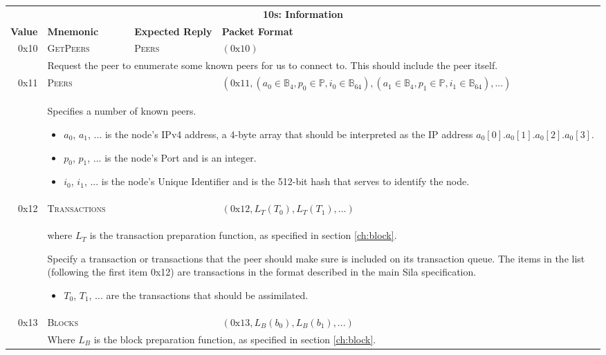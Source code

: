 \begin{tabular*}{\columnwidth}[h]{rlll}
\toprule
\multicolumn{4}{c}{\textbf{10s: Information}} \vspace{5pt} \\
\textbf{Value} & \textbf{Mnemonic} & \textbf{Expected Reply} & \textbf{Packet Format} \vspace{5pt} \\
0x10 & \textsc{GetPeers} & \textsc{Peers} & $(\text{0x}10)$ \\
& \multicolumn{3}{p{0.8\columnwidth}}{Request the peer to enumerate some known peers for us to connect to. This should include the peer itself.}\\
\midrule
0x11 & \textsc{Peers} & & $(\text{0x}11, (a_0 \in \mathbb{B}_4, p_0 \in \mathbb{P}, i_0 \in \mathbb{B}_{64}), (a_1 \in \mathbb{B}_4, p_1 \in \mathbb{P}, i_1 \in \mathbb{B}_{64}), ...)$ \\
& \multicolumn{3}{p{0.8\columnwidth}}{
Specifies a number of known peers. 
\begin{itemize}
\item $a_0$, $a_1$, ... is the node's IPv4 address, a 4-byte array that should be interpreted as the IP address $a_0[0]$.$a_0[1]$.$a_0[2]$.$a_0[3]$.
\item $p_0$, $p_1$, ... is the node's Port and is an integer.
\item $i_0$, $i_1$, ... is the node's Unique Identifier and is the 512-bit hash that serves to identify the node.
\end{itemize}
}\\
\midrule
0x12 & \textsc{Transactions} & & $(\text{0x}12, L_T(T_0), L_T(T_1), ...)$ \\
& \multicolumn{3}{p{0.8\columnwidth}}{
where $L_T$ is the transaction preparation function, as specified in section \ref{ch:block}.

Specify a transaction or transactions that the peer should make sure is included on its transaction queue. The items in the list (following the first item 0x12) are transactions in the format described in the main Sila specification.
\begin{itemize}
\item $T_0$, $T_1$, ... are the transactions that should be assimilated.
\end{itemize}
}\\
\midrule
0x13 & \textsc{Blocks} && $(\text{0x}13, L_B(b_0), L_B(b_1), ...)$ \\
& \multicolumn{3}{p{0.8\columnwidth}}{
Where $L_B$ is the block preparation function, as specified in section \ref{ch:block}.

}
\end{tabular*}
